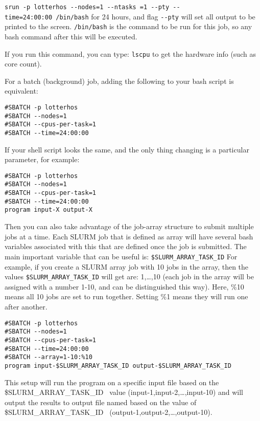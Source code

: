\documentclass[
  letterpaper,
  DIV=11,
  numbers=noendperiod]{scrreprt}
\begin{document}
\texttt{srun\ -p\ lotterhos\ -\/-nodes=1\ -\/-ntasks\ =1\ -\/-pty\ -\/-time=24:00:00\ /bin/bash}
for 24 hours, and flag \texttt{-\/-pty} will set all output to be
printed to the screen. \texttt{/bin/bash} is the command to be run for
this job, so any bash command after this will be executed.

If you run this command, you can type: \texttt{lscpu} to get the
hardware info (such as core count).

For a batch (background) job, adding the following to your bash script
is equivalent:

\begin{verbatim}
#SBATCH -p lotterhos
#SBATCH --nodes=1
#SBATCH --cpus-per-task=1
#SBATCH --time=24:00:00
\end{verbatim}

If your shell script looks the same, and the only thing changing is a
particular parameter, for example:

\begin{verbatim}
#SBATCH -p lotterhos
#SBATCH --nodes=1
#SBATCH --cpus-per-task=1
#SBATCH --time=24:00:00
program input-X output-X
\end{verbatim}

Then you can also take advantage of the job-array structure to submit
multiple jobs at a time. Each SLURM job that is defined as array will
have several bash variables associated with this that are defined once
the job is submitted. The main important variable that can be useful is:
\texttt{\$SLURM\_ARRAY\_TASK\_ID} For example, if you create a SLURM
array job with 10 jobs in the array, then the values
\texttt{\$SLURM\_ARRAY\_TASK\_ID} will get are: 1,\ldots,10 (each job in
the array will be assigned with a number 1-10, and can be distinguished
this way). Here, \%10 means all 10 jobs are set to run together. Setting
\%1 means they will run one after another.

\begin{verbatim}
#SBATCH -p lotterhos
#SBATCH --nodes=1
#SBATCH --cpus-per-task=1
#SBATCH --time=24:00:00
#SBATCH --array=1-10:%10
program input-$SLURM_ARRAY_TASK_ID output-$SLURM_ARRAY_TASK_ID
\end{verbatim}

This setup will run the program on a specific input file based on the
\$SLURM\_ARRAY\_TASK\_ID ~value (input-1,input-2,\ldots,input-10) and
will output the results to output file named based on the value of
\$SLURM\_ARRAY\_TASK\_ID ~(output-1,output-2,\ldots,output-10).
\end{document}
